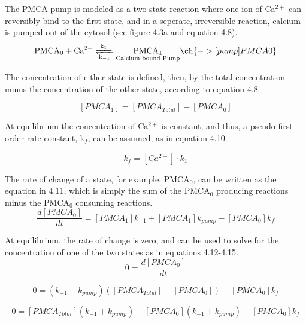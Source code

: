 \documentclass[12pt]{ucsddissertation}
\begin{document}
The PMCA pump is modeled as a two-state reaction where one ion of Ca$^{2+}$ can reversibly bind to the first state, and in a seperate, irreversible reaction, calcium is pumped out of the cytosol (see figure 4.3a and equation 4.8). 
\begin{equation}
\ce{PMCA0 + Ca^2+  <=>[\ce{k_{1}}][\ce{k_{-1}}]
$\underset{\text{Calcium-bound Pump}}{\ce{PMCA1}}$
} \ch{ ->[pump] PMCA0}
\end{equation}

The concentration of either state is defined, then, by the total concentration minus the concentration of the other state, according to equation 4.8.

\begin{equation}
\left[PMCA_{1}\right] =\left[PMCA_{Total}\right] - \left[PMCA_{0}\right]
\end{equation}

At equilibrium the concentration of Ca$^{2+}$ is constant, and thus, a pseudo-first order rate constant, k$_{f}$, can be assumed, as in equation 4.10. 

\begin{equation}
k_{f} = [Ca^{2+}] \cdot k_{1}
\end{equation}

The rate of change of a state, for example, PMCA$_{0}$, can be written as the equation in 4.11, which is simply the sum of the PMCA$_{0}$ producing reactions minus the PMCA$_{0}$ consuming reactions.
\begin{equation}
\frac{d\left[PMCA_{0}\right]}{dt} = \left[PMCA_{1}\right]k_{-1} + \left[PMCA_{1}\right] k_{pump} - \left[PMCA_{0}\right] k_{f}
\end{equation}

At equilibrium, the rate of change is zero, and can be used to solve for the concentration of one of the two states as in equations 4.12-4.15.
\begin{equation}
0 = \frac{d\left[PMCA_{0}\right]}{dt}
\end{equation}

\begin{equation}
0 = (k_{-1}-k_{pump}) (\left[PMCA_{Total}\right] - \left[PMCA_{0}\right])- \left[PMCA_{0}\right] k_{f}
\end{equation}

\begin{equation}
0 = \left[PMCA_{Total}\right] (k_{-1} + k_{pump}) - \left[PMCA_{0}\right](k_{-1} + k_{pump}) - \left[PMCA_{0}\right] k_{f}
\end{equation}
\end{document}
